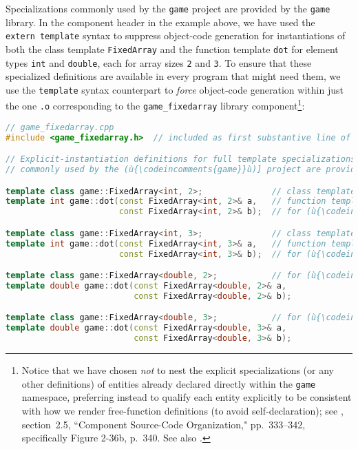 \noindent Specializations commonly used by the \lstinline!game! project are
provided by the \lstinline!game! library. In the component header in the
example above, we have used the \lstinline!extern!~\lstinline!template! syntax
to suppress object-code generation for instantiations of both the class
template \lstinline!FixedArray! and the function template \lstinline!dot! for
element types \lstinline!int! and \lstinline!double!, each for array sizes
\lstinline!2! and \lstinline!3!. To ensure that these specialized definitions
are available in every program that might need them, we use the
\lstinline!template! syntax counterpart to \emph{force} object-code
generation within just the one \lstinline!.o! corresponding to the
\lstinline!game_fixedarray! library component{\cprotect\footnote{Notice
  that we have chosen \emph{not} to nest the explicit specializations
  (or any other definitions) of entities already declared directly
  within the \lstinline!game! namespace, preferring instead to qualify each
  entity explicitly to be consistent with how we render free-function
  definitions (to avoid self-declaration); see \cite{lakos20}, section~2.5, ``Component Source-Code Organization," pp.~333--342, specifically Figure 2-36b, p.~340. See also .}}:

\begin{lstlisting}[language=C++]
// game_fixedarray.cpp
#include <game_fixedarray.h>  // included as first substantive line of code

// Explicit-instantiation definitions for full template specializations
// commonly used by the (ù{\codeincomments{game}}ù)] project are provided below.

template class game::FixedArray<int, 2>;              // class template
template int game::dot(const FixedArray<int, 2>& a,   // function template
                       const FixedArray<int, 2>& b);  // for (ù{\codeincomments{int}}ù) and (ù{\codeincomments{2}}ù)

template class game::FixedArray<int, 3>;              // class template
template int game::dot(const FixedArray<int, 3>& a,   // function template
                       const FixedArray<int, 3>& b);  // for (ù{\codeincomments{int}}ù) and (ù{\codeincomments{3}}ù)

template class game::FixedArray<double, 2>;           // for (ù{\codeincomments{double}}ù) and (ù{\codeincomments{2}}ù)
template double game::dot(const FixedArray<double, 2>& a,
                          const FixedArray<double, 2>& b);

template class game::FixedArray<double, 3>;           // for (ù{\codeincomments{double}}ù) and (ù{\codeincomments{3}}ù)
template double game::dot(const FixedArray<double, 3>& a,
                          const FixedArray<double, 3>& b);
\end{lstlisting}
    
